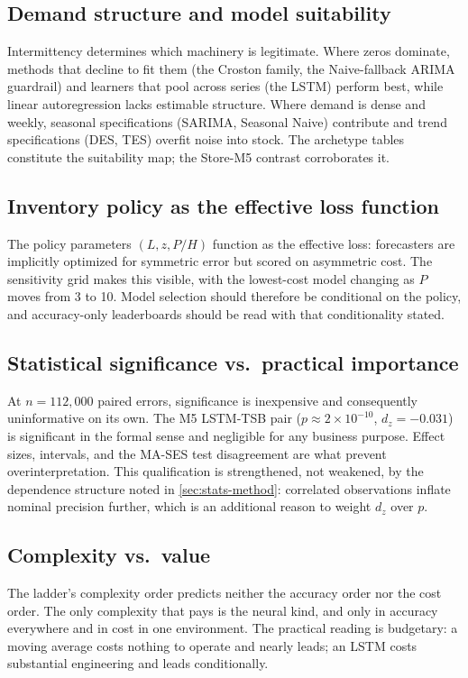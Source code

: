 \subsection{Demand structure and model suitability}
\label{sec:d-structure}
Intermittency determines which machinery is legitimate. Where zeros
dominate, methods that decline to fit them (the Croston family, the
Naive-fallback ARIMA guardrail) and learners that pool across series (the
LSTM) perform best, while linear autoregression lacks estimable structure.
Where demand is dense and weekly, seasonal specifications (SARIMA, Seasonal
Naive) contribute and trend specifications (DES, TES) overfit noise into
stock. The archetype tables constitute the suitability map; the Store-M5
contrast corroborates it.

\subsection{Inventory policy as the effective loss function}
\label{sec:d-policy-loss}
The policy parameters $(L, z, P/H)$ function as the effective loss: forecasters
are implicitly optimized for symmetric error but scored on asymmetric cost.
The sensitivity grid makes this visible, with the lowest-cost model changing
as $P$ moves from 3 to 10. Model selection should therefore be conditional on
the policy, and accuracy-only leaderboards should be read with that
conditionality stated.

\subsection{Statistical significance vs.\ practical importance}
\label{sec:d-sig}
At $n=112{,}000$ paired errors, significance is inexpensive and consequently
uninformative on its own. The M5 LSTM-TSB pair ($p \approx 2\times 10^{-10}$,
$d_z=-0.031$) is significant in the formal sense and negligible for any
business purpose. Effect sizes, intervals, and the MA-SES test disagreement
are what prevent overinterpretation. This qualification is strengthened, not
weakened, by the dependence structure noted in \cref{sec:stats-method}:
correlated observations inflate nominal precision further, which is an
additional reason to weight $d_z$ over $p$.

\subsection{Complexity vs.\ value}
\label{sec:d-complex}
The ladder's complexity order predicts neither the accuracy order nor the
cost order. The only complexity that pays is the neural kind, and only in
accuracy everywhere and in cost in one environment. The practical reading is
budgetary: a moving average costs nothing to operate and nearly leads; an
LSTM costs substantial engineering and leads conditionally.

